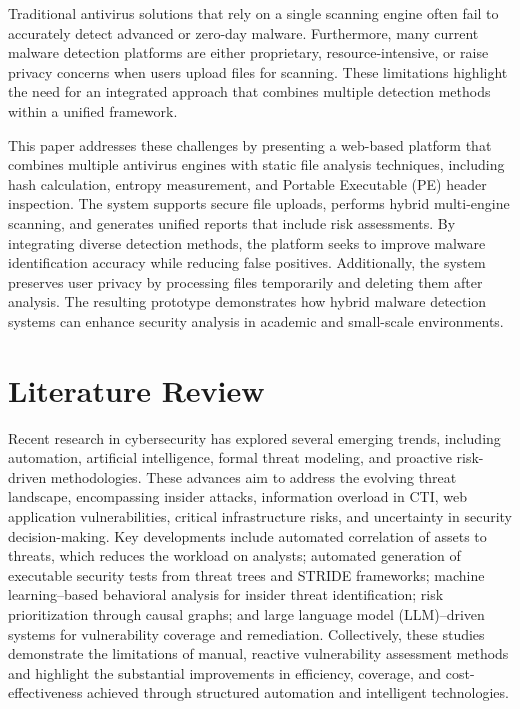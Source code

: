 \documentclass[12pt, a4paper]{article}
\begin{document}
Traditional antivirus solutions that rely on a single scanning engine often fail to accurately detect advanced or zero-day malware. Furthermore, many current malware detection platforms are either proprietary, resource-intensive, or raise privacy concerns when users upload files for scanning. These limitations highlight the need for an integrated approach that combines multiple detection methods within a unified framework.

This paper addresses these challenges by presenting a web-based platform that combines multiple antivirus engines with static file analysis techniques, including hash calculation, entropy measurement, and Portable Executable (PE) header inspection. The system supports secure file uploads, performs hybrid multi-engine scanning, and generates unified reports that include risk assessments. By integrating diverse detection methods, the platform seeks to improve malware identification accuracy while reducing false positives. Additionally, the system preserves user privacy by processing files temporarily and deleting them after analysis. The resulting prototype demonstrates how hybrid malware detection systems can enhance security analysis in academic and small-scale environments.

\section{Literature Review}

Recent research in cybersecurity has explored several emerging trends, including automation, artificial intelligence, formal threat modeling, and proactive risk-driven methodologies. These advances aim to address the evolving threat landscape, encompassing insider attacks, information overload in CTI, web application vulnerabilities, critical infrastructure risks, and uncertainty in security decision-making. Key developments include automated correlation of assets to threats, which reduces the workload on analysts; automated generation of executable security tests from threat trees and STRIDE frameworks; machine learning--based behavioral analysis for insider threat identification; risk prioritization through causal graphs; and large language model (LLM)--driven systems for vulnerability coverage and remediation. Collectively, these studies demonstrate the limitations of manual, reactive vulnerability assessment methods and highlight the substantial improvements in efficiency, coverage, and cost-effectiveness achieved through structured automation and intelligent technologies.
\end{document}
